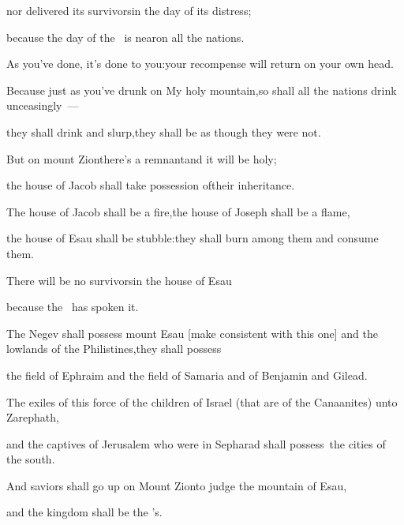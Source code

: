 \begin{inparaenum}
  \pc{}nor delivered its survivors\pa{}in the day of its distress;%

  \pb{} because the day of the \lord\ is near\pa{}on all the nations.%

  \pc{}As you've done, it's done to you:\pa{}your recompense will return on your own head.%

  \pa{} Because just as you've drunk on My holy mountain,\pa{}so shall all the nations drink unceasingly~---%

  \pb{}they shall drink and slurp,\pa{}they shall be as though they were not.%

  \pa{} But on mount Zion\pa{}there's a remnant\pa{}and it will be holy;%

  \pb{}the house of Jacob shall take possession of\pa{}their inheritance.%

  \pa{} The house of Jacob shall be a fire,\pa{}the house of Joseph shall be a flame,%

  \pb{}the house of Esau shall be stubble:\pa{}they shall burn among them and consume them.%

  \pb{}There will be no survivors\pa{}in the house of Esau%

  \pb{}because the \lord\ has spoken it.%

  \pb{} The Negev shall possess mount Esau [make consistent with this one] and the lowlands of the Philistines,\pa{}they shall possess%

  \pb{}the field of Ephraim and the field of Samaria and of Benjamin   and Gilead.%

  \pb{} The exiles of this force of the children of Israel (that are of the Canaanites) unto Zarephath,%

  \pb{}and the captives of Jerusalem who were in Sepharad shall possess\understood{}\ the cities of the south.%

  \pb{} And saviors shall go up on Mount Zion\pa{}to judge the mountain of Esau,%

  \pc{}and the kingdom shall be the \lord's.%
\end{inparaenum}
